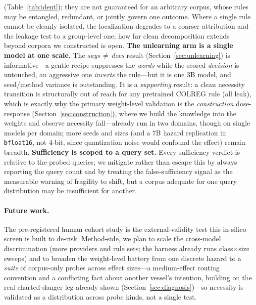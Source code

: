 \documentclass{article}
\begin{document}
(Table~\ref{tab:ident}); they are not guaranteed for an arbitrary corpus, whose rules may be
entangled, redundant, or jointly govern one outcome. Where a single rule cannot be cleanly
isolated, the localization degrades to a coarser attribution and the leakage test to a
group-level one; how far clean decomposition extends beyond corpora we constructed is open.
\textbf{The unlearning arm is a single model at one scale.} The \emph{says\,$\neq$\,does}
result (Section~\ref{sec:unlearning}) is informative---a gentle recipe suppresses the
\emph{words} while the scored \emph{decision} is untouched, an aggressive one \emph{inverts}
the rule---but it is one 3B model, and seed/method variance is outstanding. It is a
\emph{supporting} result: a clean necessity transition is structurally out of reach for any
pretrained COLREG rule (all leak), which is exactly why the primary weight-level validation is
the \emph{construction} dose-response (Section~\ref{sec:construction}), where we build the
knowledge into the weights and observe necessity fall---already run in two domains, though on
single models per domain; more seeds and sizes (and a 7B hazard replication in
\texttt{bfloat16}, not 4-bit, since quantization noise would confound the effect) remain
breadth. \textbf{Sufficiency is scoped to a query set.} Every sufficiency verdict is relative
to the probed queries; we mitigate rather than escape this by always reporting the query count
and by treating the false-sufficiency signal as the measurable warning of fragility to shift,
but a corpus adequate for one query distribution may be insufficient for another.

\paragraph{Future work.} The pre-registered human cohort study is the external-validity test this
in-silico screen is built to de-risk. Method-side, we plan to scale the cross-model discrimination
(more providers and rule sets; the harness already runs class$\times$size sweeps) and to broaden the
weight-level battery from one discrete hazard to a \emph{suite} of corpus-only probes across effect
sizes---a medium-effect routing convention and a conflicting fact about another vessel's intention,
building on the real charted-danger leg already shown (Section~\ref{sec:diagnosis})---so necessity is
validated as a distribution across probe kinds, not a single test.
\end{document}
